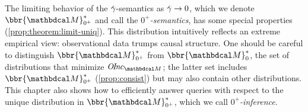 The limiting behavior of the $\zogamma$-semantics as $\zogamma \to 0$,
which we denote $\bbr{\dg M}^*_{0^+}$ and call the \emph{$0^+$\!-semantics},
has some special properties (\cref{prop:theorem:limit-uniq}).
This distribution intuitively
reflects an extreme empirical
view: observational data trumps causal structure.
One should be careful to distinguish 
$\bbr{\dg M}^*_{0^+}$
from $\bbr{\dg M}^*_0$,
the set of distributions that minimize
$\OInc_{\dg M}$; the latter  set
includes
 $\bbr{\dg M}^*_{0^+}$
(\cref{prop:consist})
but may also contain other distributions.
This chapter also shows how to efficiently answer queries with respect 
to the unique distribution in $\bbr{\dg M}^*_{0^+}$, which we call
\emph{$0^+$\!-inference}.




